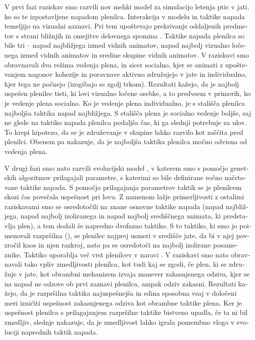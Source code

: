 \begin{slovenian}
V prvi fazi raziskav smo razvili nov mehki model \cite{demsar2014simulated} za simulacijo letenja ptic v jati, ko so te izpostavljene napadom plenilca. Interakcija v modelu in taktike napada temeljijo na vizualni zaznavi. Pri tem upoštevajo prekrivanje oddaljenih predmetov s strani bližnjih \cite{kunz2012simulations} in omejitve delovnega spomina \cite{ballerini2008interaction,engle1999individual,sherry1989hippocampus}. Taktike napada plenilca so bile tri -- napad najbližjega izmed vidnih animatov, napad najbolj vizualno ločenega izmed vidnih animatov in sredine skupine vidnih animatov. V raziskavi smo obravnavali dva režima vedenja plena, in sicer socialno, kjer se animati z upoštevanjem nagonov kohezije in poravnave aktivno združujejo v jate in individualno, kjer tega ne počnejo (izogibajo se zgolj trkom). Rezultati kažejo, da je najbolj uspešen plenilec tisti, ki lovi vizualno ločene osebke, a to predvsem v primerih, ko je vedenje plena socialno. Ko je vedenje plena individualno, je s stališča plenilca najboljša taktika napad najbližjega. S stališča plena je socialno vedenje boljše, saj ne glede na taktiko napada plenilca podaljša čas, ki ga slednji potrebuje za ulov. To krepi hipotezo, da se je združevanje v skupine lahko razvilo kot zaščita pred plenilci. Obenem pa nakazuje, da je najboljša taktika plenilca močno odvisna od vedenja plena.

V drugi fazi smo nato razvili evolucijski model \cite{demsar2015simulating}, v katerem smo s pomočjo genetskih algoritmov prilagajali parametre, s katerimi so bile definirane ročno načrtovane taktike napada. S pomočjo prilagajanja parametrov taktik se je plenilcem skozi čas povečala uspešnost pri lovu. Z namenom lažje primerljivosti z ostalimi raziskavami smo se osredotočili na znane osnovne taktike napada (napad najbližjega, napad najbolj izoliranega in napad najbolj središčnega animata, ki predstavlja plen), a tem dodali še napredno dvofazno taktiko. S to taktiko, ki smo jo poimenovali razpršilna (), se plenilec najprej usmeri v središče jate, da bi v njej povzročil kaos in njen razkroj, nato pa se osredotoči na najbolj izolirane posameznike. Taktiko uporablja več vrst plenilcev v naravi \cite{larsson2012why,pavlov2000patterns}. V raziskavi smo nato obravnavali tako vpliv zmedljivosti plenilca, kot tudi kaj se zgodi, če plen, ki se združuje v jate, kot obrambni mehanizem izvaja manever zakasnjenega odziva, kjer se na napad ne odzove ob prvi zaznavi plenilca, ampak odziv zakasni. Rezultati kažejo, da je razpršilna taktika najuspešnejša in edina sposobna vsaj v določeni meri izničiti uspešnost zakasnjenega odziva kot obrambne taktike plena. Ker je uspešnost plenilca s prilagajanjem razpršilne taktike bistveno upadla, če ta ni bil zmedljiv, slednje nakazuje, da je zmedljivost lahko igrala pomembno vlogo v evoluciji naprednih taktik napada.


\end{slovenian}
